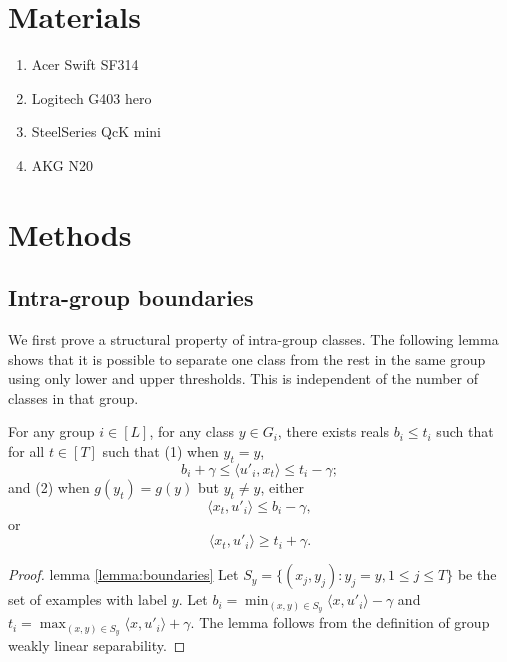 \justify

\section{Materials}
\begin{enumerate}
  \item Acer Swift SF314
  \item Logitech G403 hero
  \item SteelSeries QcK mini
  \item AKG N20
\end{enumerate}

\section{Methods}
\subsection{Intra-group boundaries}
We first prove a structural property of intra-group classes.  The
following lemma shows that it is possible to separate one class from
the rest in the same group using only lower and upper thresholds.
This is independent of the number of classes in that group.

\begin{lemma}
  For any group $i\in [L]$, for any class $y\in G_i$, there exists
  reals $b_i\leq t_i$ such that for all $t\in[T]$ such that
  (1) when $y_t=y$, 
  \[
  b_i + \gamma \leq \langle u'_i,x_t\rangle \leq t_i - \gamma;
  \]
  and (2) when $g(y_t)=g(y)$ but $y_t\neq y$, either
  \[
  \langle x_t,u'_i\rangle \leq b_i - \gamma,
  \]
  or
  \[
  \langle x_t,u'_i\rangle \geq t_i + \gamma.
  \]
  \label{lemma:boundaries}
\end{lemma}
\begin{proof}{lemma \ref{lemma:boundaries}}
  Let $S_y = \{(x_j,y_j) : y_j=y, 1\leq j\leq T\}$ be the set of
  examples with label $y$.  Let $b_i=\min_{(x,y)\in S_y}\langle
  x,u'_i\rangle-\gamma$ and $t_i=\max_{(x,y)\in S_y}\langle
  x,u'_i\rangle+\gamma$.  The lemma follows from the definition of
  group weakly linear separability.
\end{proof}

